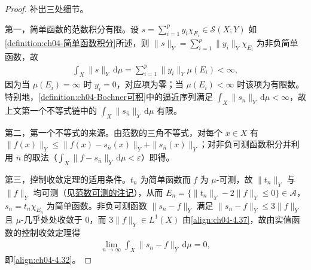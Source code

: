 \documentclass[../../main.tex]{subfiles}%
\begin{document}
\begin{proof}
补出三处细节。

第一，简单函数的范数积分有限。设 $s=\sum_{i=1}^p y_i\chi_{E_i}\in\mathcal{S}(X;Y)$ 如\cref{definition:ch04-简单函数积分}所述，则 $\|s\|_Y=\sum_{i=1}^p\|y_i\|_Y\chi_{E_i}$ 为非负简单函数，故
\begin{align*}
\int_X\|s\|_Y\,\mathrm{d}\mu=\sum_{i=1}^p\|y_i\|_Y\mu(E_i)<\infty,
\end{align*}
因为当 $\mu(E_i)=\infty$ 时 $y_i=0$，对应项为零；当 $\mu(E_i)<\infty$ 时该项为有限数。特别地，\cref{definition:ch04-Bochner可积}中的逼近序列满足 $\int_X\|s_n\|_Y\,\mathrm{d}\mu<\infty$，故上文第一个不等式链中的 $\int_X\|s_{\bar n}\|_Y\,\mathrm{d}\mu$ 有限。

第二，第一个不等式的来源。由范数的三角不等式，对每个 $x\in X$ 有 $\|f(x)\|_Y\leqslant\|f(x)-s_{\bar n}(x)\|_Y+\|s_{\bar n}(x)\|_Y$；对非负可测函数积分并利用 $\bar n$ 的取法（$\int_X\|f-s_{\bar n}\|_Y\,\mathrm{d}\mu<\varepsilon$）即得。

第三，控制收敛定理的适用条件。$t_n$ 为简单函数而 $f$ 为 $\mu$-可测，故 $\|t_n\|_Y$ 与 $\|f\|_Y$ 均可测（见\hyperref[remark:ch04-范数可测]{范数可测的注记}），从而 $E_n=\{\|t_n\|_Y-2\|f\|_Y\leqslant0\}\in\mathcal{A}$，$s_n=t_n\chi_{E_n}$ 为简单函数。非负可测函数 $\|s_n-f\|_Y$ 满足 $\|s_n-f\|_Y\leqslant3\|f\|_Y$ 且 $\mu$-几乎处处收敛于 $0$，而 $3\|f\|_Y\in L^1(X)$ 由\eqref{align:ch04-4.37}，故由实值函数的控制收敛定理得
\begin{align*}
\lim_{n\to\infty}\int_X\|s_n-f\|_Y\,\mathrm{d}\mu=0,
\end{align*}
即\eqref{align:ch04-4.32}。
\end{proof}
\end{document}
